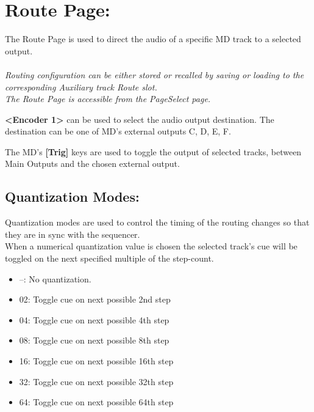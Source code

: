  \chapter{Route Page:}
 The Route Page is used to direct the audio of a specific MD track to a selected output.\\\\\textit{Routing configuration can be either stored or recalled by saving or loading to the corresponding Auxiliary track Route slot.} \\
 
\textit{The Route Page is accessible from the PageSelect page.}



\textbf{<Encoder 1>} can be used to select the audio output destination. The destination can be one of MD's external outputs C, D, E, F.

The MD's \textbf{[Trig]} keys are used to toggle the output of selected tracks, between Main Outputs and the chosen external output.

\newpage
\section{Quantization Modes:}
 Quantization modes are used to control the timing of the routing changes so that they are in sync with the sequencer.
 \\
 When a numerical quantization value is chosen the selected track’s cue will be toggled on the next specified multiple of the step-count.
 \begin{itemize}
\item --: No quantization.
\item 02: Toggle cue on next possible 2nd step
\item 04: Toggle cue on next possible 4th step
\item 08: Toggle cue on next possible 8th step 
\item 16: Toggle cue on next possible 16th step 
\item 32: Toggle cue on next possible 32th step 
\item 64: Toggle cue on next possible 64th step
 \end{itemize}
 
 